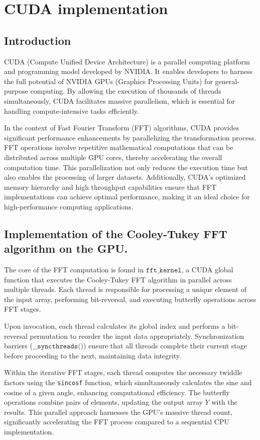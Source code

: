 \documentclass[12pt]{article}
\theoremstyle{definition}
\begin{document}
\section{CUDA implementation}
\subsection{Introduction}
CUDA (Compute Unified Device Architecture) is a parallel computing platform and programming model developed by NVIDIA. It enables developers to harness the full potential of NVIDIA GPUs (Graphics Processing Units) for general-purpose computing. By allowing the execution of thousands of threads simultaneously, CUDA facilitates massive parallelism, which is essential for handling compute-intensive tasks efficiently.

In the context of Fast Fourier Transform (FFT) algorithms, CUDA provides significant performance enhancements by parallelizing the transformation process. FFT operations involve repetitive mathematical computations that can be distributed across multiple GPU cores, thereby accelerating the overall computation time. This parallelization not only reduces the execution time but also enables the processing of larger datasets. Additionally, CUDA's optimized memory hierarchy and high throughput capabilities ensure that FFT implementations can achieve optimal performance, making it an ideal choice for high-performance computing applications.

\subsection{Implementation of the Cooley-Tukey FFT algorithm on the GPU.}

The core of the FFT computation is found in $\texttt{fft\_kernel}$, a CUDA global function that executes the Cooley-Tukey FFT algorithm in parallel across multiple threads. Each thread is responsible for processing a unique element of the input array, performing bit-reversal, and executing butterfly operations across FFT stages.

Upon invocation, each thread calculates its global index and performs a bit-reversal permutation to reorder the input data appropriately. Synchronization barriers ($\texttt{\_\_syncthreads()}$) ensure that all threads complete their current stage before proceeding to the next, maintaining data integrity.

Within the iterative FFT stages, each thread computes the necessary twiddle factors using the \texttt{sincosf} function, which simultaneously calculates the sine and cosine of a given angle, enhancing computational efficiency. The butterfly operations combine pairs of elements, updating the output array $Y$ with the results. This parallel approach harnesses the GPU's massive thread count, significantly accelerating the FFT process compared to a sequential CPU implementation.
\end{document}
